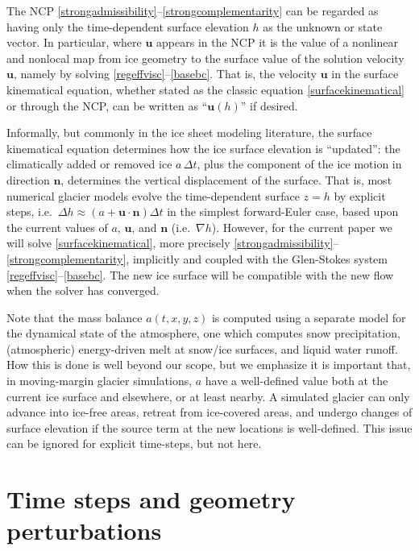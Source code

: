 \documentclass[letterpaper,final,12pt,reqno]{amsart}
\newcommand{\grad}{\nabla}
\newcommand{\bn}{\mathbf{n}}
\newcommand{\bu}{\mathbf{u}}
\begin{document}
The NCP \eqref{strongadmissibility}--\eqref{strongcomplementarity} can be regarded as having only the time-dependent surface elevation $h$ as the unknown or state vector.  In particular, where $\bu$ appears in the NCP it is the value of a nonlinear and nonlocal map from ice geometry to the surface value of the solution velocity $\bu$, namely by solving \eqref{regeffvisc}--\eqref{basebc}.  That is, the velocity $\bu$ in the surface kinematical equation, whether stated as the classic equation \eqref{surfacekinematical} or through the NCP, can be written as ``$\bu(h)$'' if desired.

Informally, but commonly in the ice sheet modeling literature, the surface kinematical equation determines how the ice surface elevation is ``updated'': the climatically added or removed ice $a\,\Delta t$, plus the component of the ice motion in direction $\bn$, determines the vertical displacement of the surface.  That is, most numerical glacier models evolve the time-dependent surface $z=h$ by explicit steps, i.e.~$\Delta h \approx \left(a + \bu\cdot \bn\right) \Delta t$ in the simplest forward-Euler case, based upon the current values of $a$, $\bu$, and $\bn$ (i.e.~$\grad h$).  However, for the current paper we will solve \eqref{surfacekinematical}, more precisely \eqref{strongadmissibility}--\eqref{strongcomplementarity}, implicitly and coupled with the Glen-Stokes system \eqref{regeffvisc}--\eqref{basebc}.  The new ice surface will be compatible with the new flow when the solver has converged.

Note that the mass balance $a(t,x,y,z)$ is computed using a separate model for the dynamical state of the atmosphere, one which computes snow precipitation, (atmospheric) energy-driven melt at snow/ice surfaces, and liquid water runoff.  How this is done is well beyond our scope, but we emphasize it is important that, in moving-margin glacier simulations, $a$ have a well-defined value both at the current ice surface and elsewhere, or at least nearby.  A simulated glacier can only advance into ice-free areas, retreat from ice-covered areas, and undergo changes of surface elevation if the source term at the new locations is well-defined.  This issue can be ignored for explicit time-steps, but not here.


\section{Time steps and geometry perturbations} \label{sec:perturb}
\end{document}
